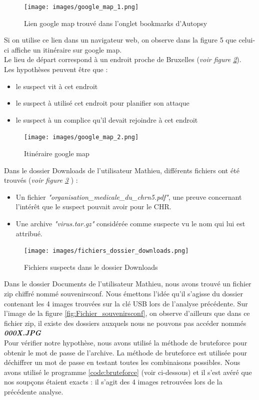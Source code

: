 \documentclass[a4paper]{article}
\begin{document}
\begin{figure}[H]
    \centering
    \texttt{[image: images/google\_map\_1.png]}
    \caption{Lien google map trouvé dans l'onglet bookmarks d'Autopsy}
    \label{fig:lien_google_map}
\end{figure}

Si on utilise ce lien dans un navigateur web, on observe dans la figure 5 que celui-ci affiche un itinéraire sur google map.\\
Le lieu de départ correspond à un endroit proche de Bruxelles (\emph{voir figure \ref{fig:itinéraire_google_map}}). \\
Les hypothèses peuvent être que :
\begin{itemize}
    \item le suspect vit à cet endroit
    \item le suspect à utilisé cet endroit pour planifier son attaque
    \item le suspect à un complice qu'il devait rejoindre à cet endroit
\end{itemize}

\begin{figure}[H]
    \centering
    \texttt{[image: images/google\_map\_2.png]}
    \caption{Itinéraire google map}
    \label{fig:itinéraire_google_map}
\end{figure}



Dans le dossier Downloads de l'utilisateur Mathieu, différents fichiers ont été trouvés (\emph{voir figure \ref{fig:Fichiers_suspects_downloads}} ) :
\begin{itemize}
    \item Un fichier \emph{"organisation\_medicale\_du\_chrn5.pdf"}, une preuve concernant l'intérêt que le suspect pouvait avoir pour le CHR.
    \item Une archive \emph{"virus.tar.gz"} considérée comme suspecte vu le nom qui lui est attribué. 
\end{itemize}

\begin{figure}[H]
    \centering
    \texttt{[image: images/fichiers\_dossier\_downloads.png]}
    \caption{Fichiers suspects dans le dossier Downloads}
    \label{fig:Fichiers_suspects_downloads}
\end{figure}

Dans le dossier Documents de l'utilisateur Mathieu, nous avons trouvé un fichier zip chiffré nommé souvenirsconf. Nous émettons l'idée qu'il s'agisse du dossier contenant les 4 images trouvées sur la clé USB lors de l'analyse précédente. Sur l'image de la figure \ref{fig:Fichier_souvenirsconf}, on observe d'ailleurs que dans ce fichier zip, il existe des dossiers auxquels nous ne pouvons pas accéder nommés \textbf{\textit{000X.JPG}} \\ \smallskip
Pour vérifier notre hypothèse, nous avons utilisé la méthode de bruteforce pour obtenir le mot de passe de l'archive. La méthode de bruteforce est utilisée pour déchiffrer un mot de passe en testant toutes les combinaisons possibles. Nous avons utilisé le programme \ref{code:bruteforce} (voir ci-dessous) et il s'est avéré que nos soupçons étaient exacts : il s'agit des 4 images retrouvées lors de la précédente analyse.
\end{document}
